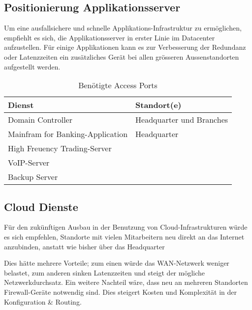 \subsection{Positionierung Applikationsserver}

Um eine ausfallsichere und schnelle Applikations-Infrastruktur zu ermöglichen, empfiehlt es sich, die Applikationsserver in erster Linie im Datacenter aufzustellen. Für einige Applikationen kann es zur Verbesserung der Redundanz oder Latenzzeiten ein zusätzliches Gerät bei allen grösseren Aussenstandorten aufgestellt werden. 

\begin{table}[h]
	\centering
	\begin{tabu} to \linewidth {l l}
		\toprule 
		Dienst & Standort(e) \\
		\midrule
		Domain Controller & Headquarter und Branches \\
		Mainfram for Banking-Application & Headquarter \\
		High Freuency Trading-Server &  \\
		VoIP-Server & \\
		Backup Server & \\
		\bottomrule 
	\end{tabu} 
	\label{tbl:require_access_ports}
	\caption{Benötigte Access Ports}
\end{table}

\subsection{Cloud Dienste}

Für den zukünftigen Ausbau in der Benutzung von Cloud-Infrastrukturen würde es sich empfehlen, Standorte mit vielen Mitarbeitern neu direkt an das Internet anzubinden, anstatt wie bisher über das Headquarter

Dies hätte mehrere Vorteile; zum einen würde das WAN-Netzwerk weniger belastet, zum anderen sinken Latenzzeiten und steigt der mögliche Netzwerkdurchsatz. Ein weitere Nachteil wäre, dass neu an mehreren Standorten Firewall-Geräte notwendig sind. Dies steigert Kosten und Komplexität in der Konfiguration \& Routing.



